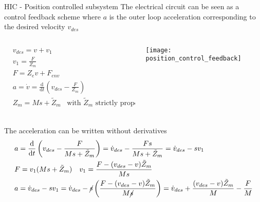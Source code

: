 \begin{frame}[shrink=30]{HIC - Position controlled subsystem}
  The electrical circuit \alert{can be seen as a control feedback scheme where $a$ is the \alert outer loop
  acceleration} corresponding to the desired velocity $v_{des}$
  \begin{columns}
    \begin{column}{0.4\textwidth}
      \begin{align*}
        &v_{des} = v + v_1\\
        &v_1 = \frac{F}{Z_m}\\ 
        &F = Z_e v + F_{env}\\
        &a = \dot{v} = \frac{\mathrm{d}}{\mathrm{d}t} \left(v_{des} - \frac{F}{Z_m} \right)\\
        &Z_m = M s + \tilde{Z}_m \enspace \text{ with } \tilde{Z}_m \text{ strictly proper}\\
      \end{align*}
    \end{column}
    \begin{column}{0.5\textwidth}
      \centering
      \texttt{[image: position\_control\_feedback]}
    \end{column}
  \end{columns}
  The acceleration can be written \alert{without derivatives}
  \begin{align*}
    &a = \frac{\mathrm{d}}{\mathrm{d}t} \left(v_{des} - \frac{F}{Ms + \tilde{Z}_m} \right) = \dot{v}_{des} - \frac{Fs}{Ms + \tilde{Z}_{m}} = \dot{v}_{des} - s v_1 \\
    &F = v_1 (Ms + \tilde{Z}_m) \quad v_1 = \frac{F - (v_{des} - v)\tilde{Z}_m}{Ms}\\
    &a = \dot{v}_{des} - s v_1 = \dot{v}_{des} - \cancel{s} \left( \frac{F - (v_{des} - v)\tilde{Z}_m}{M\cancel{s}} \right) = \dot{v}_{des} + \frac{(v_{des} - v)\tilde{Z}_m}{M} - \frac{F}{M}
  \end{align*}
\end{frame}

